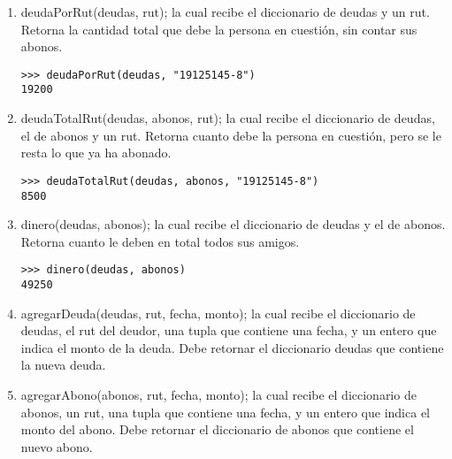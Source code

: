 \begin{enumerate}

\item deudaPorRut(deudas, rut); la cual recibe el diccionario de deudas y un rut. Retorna la cantidad total que debe la persona en cuestión, sin contar sus abonos.

\begin{lstlisting}[style=consola]
>>> deudaPorRut(deudas, "19125145-8")
19200
\end{lstlisting}

\item deudaTotalRut(deudas, abonos, rut); la cual recibe el diccionario de deudas, el de abonos y un rut. Retorna cuanto debe la persona en cuestión, pero se le resta lo que ya ha abonado.

\begin{lstlisting}[style=consola]
>>> deudaTotalRut(deudas, abonos, "19125145-8")
8500
\end{lstlisting}

\item dinero(deudas, abonos); la cual recibe el diccionario de deudas y el de abonos. Retorna cuanto le deben en total todos sus amigos.

\begin{lstlisting}[style=consola]
>>> dinero(deudas, abonos)
49250
\end{lstlisting}

\item agregarDeuda(deudas, rut, fecha, monto); la cual recibe el diccionario de deudas, el rut del deudor, una tupla que contiene una fecha, y un entero que indica el monto de la deuda. Debe retornar el diccionario deudas que contiene la nueva deuda. 

\item agregarAbono(abonos, rut, fecha, monto); la cual recibe el diccionario de abonos, un rut, una tupla que contiene una fecha, y un entero que indica el monto del abono. Debe retornar el diccionario de abonos que contiene el nuevo abono. 


\end{enumerate}


